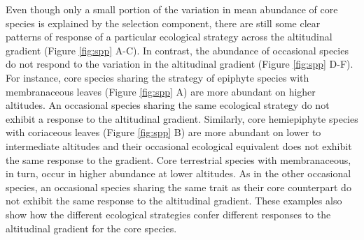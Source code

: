 \documentclass[12pt]{article}
\begin{document}
Even though only a small portion of the variation in mean abundance of core species is explained by the selection component, there are still some clear patterns of response of a particular ecological strategy across the altitudinal gradient (Figure \ref{fig:spp} A-C). In contrast, the abundance of occasional species do not respond to the variation in the altitudinal gradient (Figure \ref{fig:spp} D-F). For instance, core species sharing the strategy of epiphyte species with membranaceous leaves (Figure \ref{fig:spp} A) are more abundant on higher altitudes. An occasional species sharing the same ecological strategy do not exhibit a response to the altitudinal gradient. Similarly, core hemiepiphyte species with coriaceous leaves (Figure \ref{fig:spp} B) are more abundant on lower to intermediate altitudes and their occasional ecological equivalent does not exhibit the same response to the gradient. Core terrestrial species with membranaceous, in turn, occur in higher abundance at lower altitudes. As in the other occasional species, an occasional species sharing the same trait as their core counterpart do not exhibit the same response to the altitudinal gradient. These examples also show how the different ecological strategies confer different responses to the altitudinal gradient for the core species.
\end{document}
